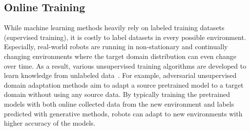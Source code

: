 

\subsection{Online Training}
While machine learning methods heavily rely on labeled training datasets (supervised training), it is costly to label datasets in every possible environment. 
Especially, real-world robots are running in non-stationary and continually changing environments where the target domain distribution can even change over time.
As a result, various unsupervised training algorithms are developed to learn knowledge from unlabeled data~\cite{wang2022continual,wilson_survey_2020,ahmed_unsupervised_2021}.
For example, adversarial unsupervised domain adaptation methods \cite{wang2022continual,9710205,9710300} aim to adapt a source pretrained model to a target domain without using any source
data. 
By typically training the pretrained models with both online collected data from the new environment and labels predicted with generative methods, robots can adapt to new environments with higher accuracy of the models. 

